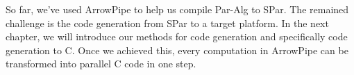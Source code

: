 So far, we've used ArrowPipe to help us compile Par-Alg to SPar. The remained challenge is the code generation from SPar to a target platform. In the next chapter, we will introduce our methods for code generation and specifically code generation to C. Once we achieved this, every computation in ArrowPipe can be transformed into parallel C code in one step.

